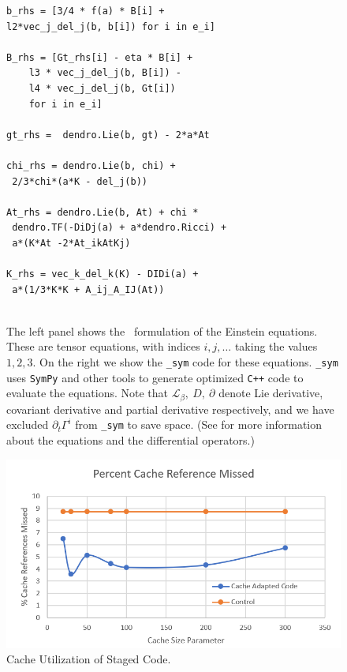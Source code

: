 \documentclass[10pt, conference]{IEEEtran} %
\begin{document}
\begin{figure}[t]
\begin{minipage}[t]{.52\textwidth}
\begin{verbatim}
b_rhs = [3/4 * f(a) * B[i] + 
l2*vec_j_del_j(b, b[i]) for i in e_i]
		
B_rhs = [Gt_rhs[i] - eta * B[i] + 
	l3 * vec_j_del_j(b, B[i]) - 
	l4 * vec_j_del_j(b, Gt[i]) 
	for i in e_i]
		
gt_rhs =  dendro.Lie(b, gt) - 2*a*At

chi_rhs = dendro.Lie(b, chi) + 
 2/3*chi*(a*K - del_j(b)) 
		
At_rhs = dendro.Lie(b, At) + chi *
 dendro.TF(-DiDj(a) + a*dendro.Ricci) +
 a*(K*At -2*At_ikAtKj)
		
K_rhs = vec_k_del_k(K) - DIDi(a) +
 a*(1/3*K*K + A_ij_A_IJ(At)) 
		
\end{verbatim}
	\end{minipage}
	\caption{\label{fig:symb} The left panel shows the \BSSN ~formulation of the 
		Einstein equations. These are tensor equations, with indices $i,j,\ldots$
		taking the values $1, 2, 3$. On the right we show the \texttt{{\dendro\_sym}}
		code for these equations. \texttt{\dendro\_sym} uses \texttt{SymPy} and other tools
		to generate optimized \texttt{C++} code to evaluate the equations. Note that $\mathcal{L}_\beta,\ D,\ \partial$ denote Lie derivative, covariant derivative and partial derivative respectively, and we have excluded $\partial_t\Gamma^i$ from \texttt{\dendro\_sym} to save space. (See \cite{Baumgarte:1998te,Alcubierre:1138167} for more information about the equations and the differential operators.)}
	\label{fig:bssneqs}
	\vspace{-0.15in}
\end{figure}

\begin{figure}
  \centering
    \includegraphics[width=\linewidth]{../cache_miss_plot.png}
    \caption{Cache Utilization of Staged Code.}
    \label{fig:cache_results}
  \end{figure}
  
\end{document}
